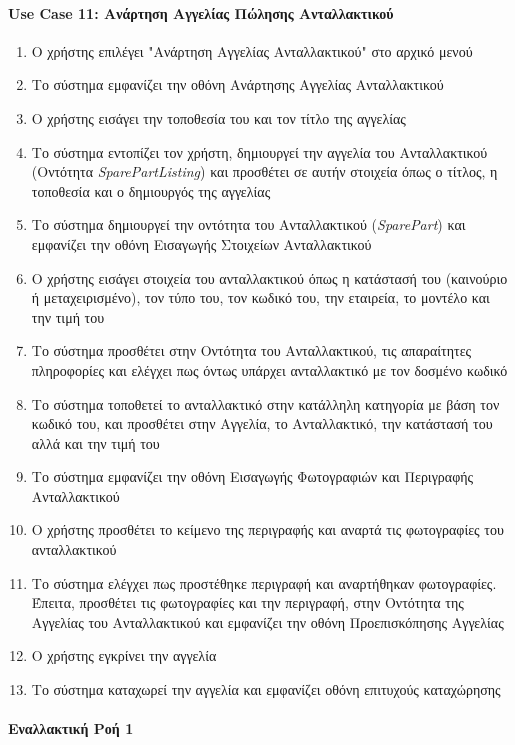\documentclass{../ol-softwaremanual}
\begin{document}
	\paragraph{\en Use Case 11: \gr Ανάρτηση Αγγελίας Πώλησης Ανταλλακτικού \gr}
	\begin{enumerate}
		\item Ο χρήστης επιλέγει \en"\gr Ανάρτηση Αγγελίας Ανταλλακτικού\en" \gr στο αρχικό μενού
		\item Το σύστημα εμφανίζει την οθόνη Ανάρτησης Αγγελίας Ανταλλακτικού
		\item Ο χρήστης εισάγει την τοποθεσία του και τον τίτλο της αγγελίας		
		\item Το σύστημα εντοπίζει τον χρήστη, δημιουργεί την αγγελία του Ανταλλακτικού (Οντότητα \en\textit{SparePartListing}\gr) και προσθέτει σε αυτήν στοιχεία όπως ο τίτλος, η τοποθεσία και ο δημιουργός της αγγελίας
		\item Το σύστημα δημιουργεί την οντότητα του Ανταλλακτικού (\en \textit{SparePart}\gr) και εμφανίζει την οθόνη Εισαγωγής Στοιχείων Ανταλλακτικού		
		\item Ο χρήστης εισάγει στοιχεία του ανταλλακτικού όπως η κατάστασή του (καινούριο ή μεταχειρισμένο), τον τύπο του, τον κωδικό του, την εταιρεία, το μοντέλο και την τιμή του		
		\item Το σύστημα προσθέτει στην Οντότητα του Ανταλλακτικού, τις απαραίτητες πληροφορίες και ελέγχει πως όντως υπάρχει ανταλλακτικό με τον δοσμένο κωδικό		
		\item Το σύστημα τοποθετεί το ανταλλακτικό στην κατάλληλη κατηγορία με βάση τον κωδικό του, και προσθέτει στην Αγγελία, το Ανταλλακτικό, την κατάστασή του αλλά και την τιμή του
		\item Το σύστημα εμφανίζει την οθόνη Εισαγωγής Φωτογραφιών και Περιγραφής Ανταλλακτικού
		\item Ο χρήστης προσθέτει το κείμενο της περιγραφής και αναρτά τις φωτογραφίες του ανταλλακτικού		
		\item Το σύστημα ελέγχει πως προστέθηκε περιγραφή και αναρτήθηκαν φωτογραφίες. Έπειτα, προσθέτει τις φωτογραφίες και την περιγραφή, στην Οντότητα της Αγγελίας του Ανταλλακτικού και εμφανίζει την οθόνη Προεπισκόπησης Αγγελίας		
		\item Ο χρήστης εγκρίνει την αγγελία		
		\item Το σύστημα καταχωρεί την αγγελία και εμφανίζει οθόνη επιτυχούς καταχώρησης
	\end{enumerate}
	
	
	\paragraph{Εναλλακτική Ροή 1}
	
\end{document}
